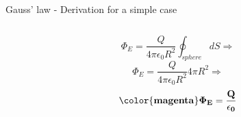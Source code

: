 \begin{frame}{Gauss' law - Derivation for a simple case}
\begin{columns}
\begin{column}{0.66\textwidth}
\begin{equation*}
    \end{equation*}
    \begin{equation*}
        \Phi_E = \frac{Q}{4\pi\epsilon_0 R^{2}} \oint_{sphere} dS \Rightarrow
    \end{equation*}
    \begin{equation*}
        \Phi_E = \frac{Q}{4\pi\epsilon_0 R^{2}} 4\pi R^{2} \Rightarrow
    \end{equation*}
    \begin{equation*}
    {\bf \color{magenta}
        \Phi_E = \frac{Q}{\epsilon_0}
    }
    \end{equation*}
  \end{column}
\end{columns}
\end{frame}


%
%
%

